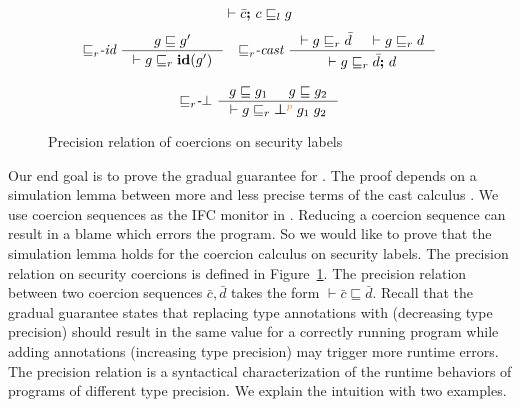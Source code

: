 \begin{figure}[tbp]
{\begin{gather*}
              {\vdash \bar{c} \ensuremath{\boldsymbol{;}\,}c \sqsubseteq_l g}
  \end{gather*}}
 {\small
  \begin{gather*}
    {\sqsubseteq}_r\textit{-id} ~
    \inference{g \sqsubseteq g'}
              {\vdash g \sqsubseteq_r \id{g'}}
    \quad
    {\sqsubseteq}_r\textit{-cast} ~
    \inference{\vdash g \sqsubseteq_r \bar{d} & \vdash g \sqsubseteq_r d}
              {\vdash g \sqsubseteq_r \bar{d} \seq d}
    \\[2ex]
    {\sqsubseteq}_r\textit{-}\bot ~
    \inference{g \sqsubseteq g_1 & g \sqsubseteq g_2}
              {\vdash g \sqsubseteq_r \err{g_1}{g_2}{p}}
  \end{gather*}}
  \caption{Precision relation of coercions on security labels}
  \label{fig:cexpr-prec}
\end{figure}

Our end goal is to prove the gradual guarantee for \Surface.
The proof depends on a simulation lemma between more and less precise terms of
the cast calculus \CC . We use coercion sequences as the IFC monitor in \CC.
Reducing a coercion sequence can result in a blame which errors the program. So
we would like to prove that the simulation lemma holds for the coercion calculus
on security labels.
%
The precision relation on security coercions is defined in
Figure~\ref{fig:cexpr-prec}. The precision relation between two coercion
sequences $\bar{c},\bar{d}$ takes the form $\vdash \bar{c} \sqsubseteq \bar{d}$.
Recall that the gradual guarantee states that replacing type annotations with
\unk (decreasing type precision) should result in the same value for a correctly
running program while adding annotations (increasing type precision) may trigger
more runtime errors. The precision relation is a syntactical characterization of
the runtime behaviors of programs of different type precision. We explain the
intuition with two examples.

